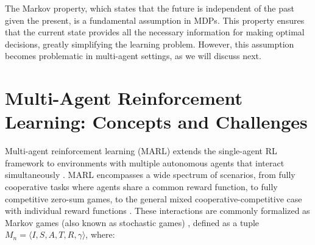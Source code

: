 The Markov property, which states that the future is independent of the past given the present, is a fundamental assumption in MDPs. This property ensures that the current state provides all the necessary information for making optimal decisions, greatly simplifying the learning problem. However, this assumption becomes problematic in multi-agent settings, as we will discuss next.

\section{Multi-Agent Reinforcement Learning: Concepts and Challenges}

Multi-agent reinforcement learning (MARL) extends the single-agent RL framework to environments with multiple autonomous agents that interact simultaneously \cite{marl-book,yang2020overview, huh2024multiagentreinforcementlearningcomprehensive, busoniu2010multi, zhang2021multi}. MARL encompasses a wide spectrum of scenarios, from fully cooperative tasks where agents share a common reward function, to fully competitive zero-sum games, to the general mixed cooperative-competitive case with individual reward functions \cite{nowé2012game}. These interactions are commonly formalized as Markov games (also known as stochastic games) \cite{littman1994markov, shapley1953stochastic}, defined as a tuple $M_n = \langle I, S, A, T, R, \gamma \rangle$, where:

